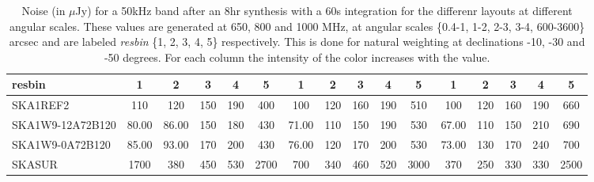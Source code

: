 \begin{table}[!htp]
{{\begin{tabular}{|lccccc||ccccc||ccccc|}
 resbin  &1 & 2 & 3 & 4 & 5 & 1 & 2 & 3 & 4 & 5 & 1 & 2 & 3 & 4 & 5 \tabularnewline \hline
SKA1REF2 & 110 \cellcolor{blue!18.78} & 120 \cellcolor{red!22.86} & 150 \cellcolor{green!18.00} & 190 \cellcolor{orange!19.20} & 400 \cellcolor{purple!18.00} & 100 \cellcolor{blue!19.94} & 120 \cellcolor{red!19.83} & 160 \cellcolor{green!19.35} & 190 \cellcolor{orange!18.00} & 510 \cellcolor{purple!18.00} & 100 \cellcolor{blue!22.57} & 120 \cellcolor{red!21.00} & 160 \cellcolor{green!20.33} & 190 \cellcolor{orange!18.00} & 660 \cellcolor{purple!18.00}\\ \hline 
SKA1W9-12A72B120 & 80.00 \cellcolor{blue!18.00} & 86.00 \cellcolor{red!18.00} & 150 \cellcolor{green!18.00} & 180 \cellcolor{orange!18.00} & 430 \cellcolor{purple!18.55} & 71.00 \cellcolor{blue!18.00} & 110 \cellcolor{red!18.00} & 150 \cellcolor{green!18.00} & 190 \cellcolor{orange!18.00} & 530 \cellcolor{purple!18.34} & 67.00 \cellcolor{blue!18.00} & 110 \cellcolor{red!18.00} & 150 \cellcolor{green!18.00} & 210 \cellcolor{orange!24.00} & 690 \cellcolor{purple!18.68}\\ \hline 
SKA1W9-0A72B120 & 85.00 \cellcolor{blue!18.13} & 93.00 \cellcolor{red!19.00} & 170 \cellcolor{green!20.80} & 200 \cellcolor{orange!20.40} & 430 \cellcolor{purple!18.55} & 76.00 \cellcolor{blue!18.33} & 120 \cellcolor{red!19.83} & 170 \cellcolor{green!20.71} & 200 \cellcolor{orange!19.27} & 530 \cellcolor{purple!18.34} & 73.00 \cellcolor{blue!18.83} & 130 \cellcolor{red!24.00} & 170 \cellcolor{green!22.67} & 240 \cellcolor{orange!33.00} & 700 \cellcolor{purple!18.91}\\ \hline 
SKASUR & 1700 \cellcolor{blue!60.00} & 380 \cellcolor{red!60.00} & 450 \cellcolor{green!60.00} & 530 \cellcolor{orange!60.00} & 2700 \cellcolor{purple!60.00} & 700 \cellcolor{blue!60.00} & 340 \cellcolor{red!60.00} & 460 \cellcolor{green!60.00} & 520 \cellcolor{orange!60.00} & 3000 \cellcolor{purple!60.00} & 370 \cellcolor{blue!60.00} & 250 \cellcolor{red!60.00} & 330 \cellcolor{green!60.00} & 330 \cellcolor{orange!60.00} & 2500 \cellcolor{purple!60.00}\tabularnewline \hline 
\end{tabular}}\hfil 

\caption{Noise (in $\mu$Jy) for a 50kHz band after an 8hr synthesis with a 60s integration for the differenr layouts at different angular scales. These values are generated at 650, 800 and 1000 MHz, at angular scales \{0.4-1, 1-2, 2-3, 3-4, 600-3600\} arcsec and are labeled {\it resbin} \{1, 2, 3, 4, 5\} respectively. This is done for natural weighting at declinations -10, -30 and -50 degrees. For each column the intensity of the color increases with the value.}\label{tab:noise50k-band1}}
 \end{table}